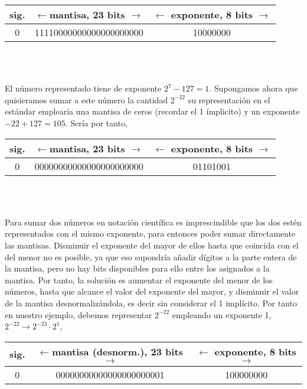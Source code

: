 \begin{minipage}{\textwidth}
	\centering	
\begin{tabular}{|c||c||c|}
\hline
sig.&$\leftarrow$mantisa, 23 bits $\rightarrow$&$\leftarrow$ exponente, 8 bits $\rightarrow$\\
\hline
0&11110000000000000000000&10000000\\
\hline
\end{tabular}\\
\ \\
\end{minipage}
\begin{paracol}{2}
El número representado tiene de exponente $2^7-127=1$. Supongamos ahora que quisieramos sumar a este número la cantidad $2^{-22}$ su representación en el estándar emplearía una mantisa de ceros (recordar el 1 ímplicito) y un exponente $-22+127=105$. Sería por tanto,
\end{paracol}
\begin{minipage}{\textwidth}
	\centering	
\begin{tabular}{|c||c||c|}
\hline
sig.&$\leftarrow$mantisa, 23 bits $\rightarrow$&$\leftarrow$ exponente, 8 bits $\rightarrow$\\
\hline
0&00000000000000000000000&01101001\\
\hline
\end{tabular}\\
\ \\
\end{minipage}
\begin{paracol}{2}
Para sumar dos números en notación científica es imprescindible que los dos estén representados con el mismo exponente, para entonces poder sumar directamente las mantisas. Disminuir el exponente del mayor de ellos hasta que coincida con el del menor no es posible, ya que eso supondría añadir dígitos a la parte entera de la mantisa, pero no hay bits disponibles para ello entre los asignados a la mantisa. Por tanto, la solución es aumentar el exponente del menor de los números, hasta que alcance el valor del exponente del mayor, y disminuir el valor de la mantisa desnormalizándola, es decir sin considerar el 1 implícito. 
Por tanto en nuestro ejemplo, debemos representar $2^{-22}$ empleando un exponente 1, $2^{-22}\rightarrow 2^{-23}\cdot 2^1$,
\end{paracol}

\begin{minipage}{\textwidth}
	\centering	
\begin{tabular}{|c||c||c|}
\hline
sig.&$\leftarrow$mantisa \textbf{(desnorm.)}, 23 bits $\rightarrow$&$\leftarrow$ exponente, 8 bits $\rightarrow$\\
\hline
0&00000000000000000000001&100000000\\
\hline
\end{tabular}\\
\ \\
\end{minipage}


